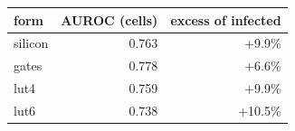 \begin{tabular}{lrr}
\hline
form & AUROC (cells) & excess of infected \\
\hline
silicon & 0.763 & +9.9\% \\
gates & 0.778 & +6.6\% \\
lut4 & 0.759 & +9.9\% \\
lut6 & 0.738 & +10.5\% \\
\hline
\end{tabular}
